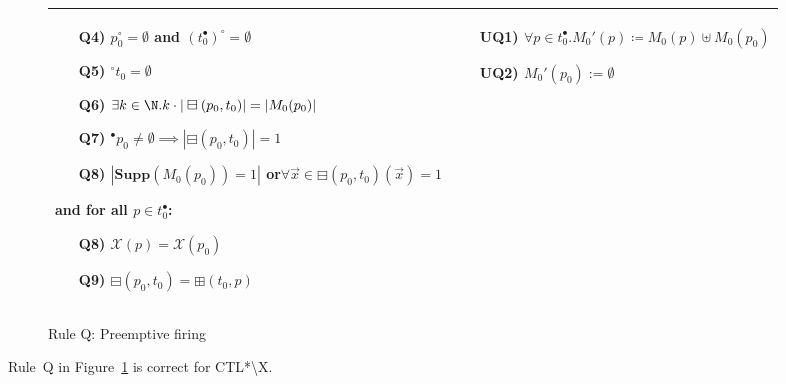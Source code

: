 \begin{figure}[h!]
\begin{adjustbox}{center}
\begin{tabular}{|p{65mm}|p{60mm}|}
\begin{itemize}[leftmargin=10mm]
                \item[Q4)] $p_0^\circ=\emptyset$ and $(t_0^\bullet)^\circ=\emptyset$
                \item[Q5)] ${}^\circ t_0=\emptyset$
                \item[Q6)] $\exists k\in\N . k\cdot |\boxminus(p_0, t_0)| = |M_0(p_0)|$
                \item[Q7)] ${}^\bullet p_0\neq\emptyset\implies |\boxminus(p_0, t_0)|=1$
                \item[Q8)] $|\textbf{Supp}(M_0(p_0))=1|$ or\newline $\forall\vec x\in\boxminus(p_0,t_0)(\vec x)=1$
            \end{itemize}
            and for all $p\in t_0^\bullet$:
            \begin{itemize}[leftmargin=10mm]
                \item[Q8)] $\mathcal X(p) = \mathcal X(p_0) $
                \item[Q9)] $\boxminus(p_0, t_0) = \boxplus(t_0, p)$
            \end{itemize}
            &
            \begin{itemize}[leftmargin=10mm]
                \item[UQ1)] $\forall p \in t_0^\bullet . M_0'(p) \coloneqq M_0(p) \uplus M_0(p_0) $
                \item[UQ2)] $M_0'(p_0):=\emptyset$
            \end{itemize} \\ \hline
        \end{tabular}
    \end{adjustbox}
    \caption{Rule Q: Preemptive firing}
    \label{fig:rule_q_cpn}
\end{figure}

\begin{theorem}
    Rule~Q in Figure~\ref{fig:rule_q_cpn} is correct for CTL*\textbackslash X.
\end{theorem}
